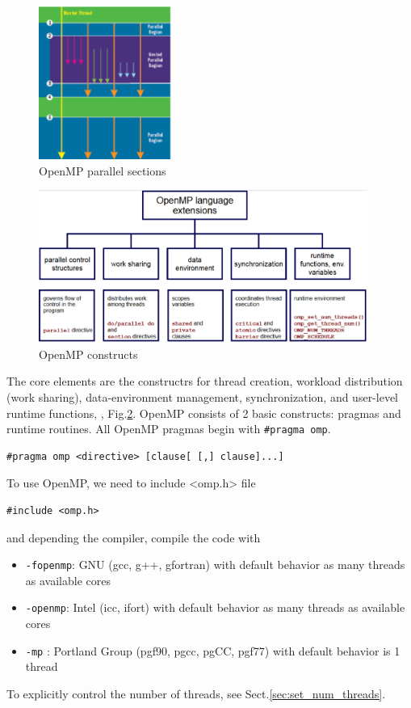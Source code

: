  \begin{figure}[hbt]
  \centerline{\includegraphics[height=5cm,
  angle=0]{./images/OpenMP_concept.eps}}
  \caption{OpenMP parallel sections}
  \label{fig:OpenMP_concept}
\end{figure}


\begin{figure}[hbt]
  \centerline{\includegraphics[height=5cm,
    angle=0]{./images/openMP_structure.eps}}
  \caption{OpenMP constructs}
\label{fig:OpenMP_core_elements}
\end{figure}

The core elements are the constructrs for thread creation, workload distribution
(work sharing), data-environment management, synchronization, and user-level
runtime functions, , Fig.\ref{fig:OpenMP_core_elements}. OpenMP consists of 2
basic constructs: pragmas and runtime routines. All OpenMP pragmas begin with
\verb!#pragma omp!.
\begin{verbatim}
#pragma omp <directive> [clause[ [,] clause]...]
\end{verbatim}

To use OpenMP, we need to include <omp.h> file
\begin{verbatim}
#include <omp.h>
\end{verbatim}
and depending the compiler, compile the code with 
\begin{itemize}
  \item \verb!-fopenmp!: GNU (gcc, g++, gfortran) with default behavior as many
  threads as available cores
  \item \verb!-openmp!: Intel (icc, ifort) with default behavior as many threads
  as available cores
  \item \verb!-mp! : Portland Group (pgf90, pgcc, pgCC, pgf77) with default
  behavior is 1 thread
\end{itemize}
To explicitly control the number of threads, see Sect.\ref{sec:set_num_threads}.

